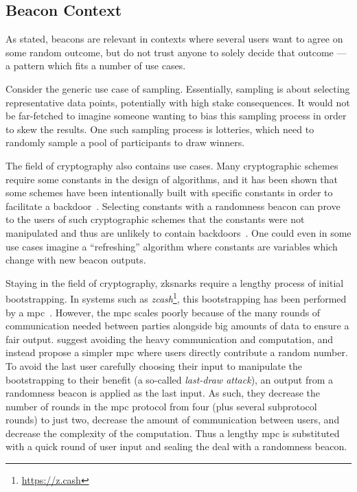 \subsection{Beacon Context}
As stated, beacons are relevant in contexts where several users want to agree on some random outcome, but do not trust anyone to solely decide that outcome --- a pattern which fits a number of use cases.

Consider the generic use case of sampling.
Essentially, sampling is about selecting representative data points, potentially with high stake consequences.
It would not be far-fetched to imagine someone wanting to bias this sampling process in order to skew the results.
One such sampling process is lotteries, which need to randomly sample a pool of participants to draw winners.

The field of cryptography also contains use cases.
Many cryptographic schemes require some constants in the design of algorithms, and it has been shown that some schemes have been intentionally built with specific constants in order to facilitate a backdoor~\cite{nist2014backdoor}.
Selecting constants with a randomness beacon can prove to the users of such cryptographic schemes that the constants were not manipulated and thus are unlikely to contain backdoors~\cite{baigneres2015trap}.
One could even in some use cases imagine a \enquote{refreshing} algorithm where constants are variables which change with new beacon outputs.

Staying in the field of cryptography, \glspl{zksnark} require a lengthy process of initial bootstrapping.
In systems such as \textit{zcash}\footnote{\url{https://z.cash}}, this bootstrapping has been performed by a \gls{mpc}~\cite{snarkparameters}.
However, the \gls{mpc} scales poorly because of the many rounds of communication needed between parties alongside big amounts of data to ensure a fair output.
\citet{mpcsnarks} suggest avoiding the heavy communication and computation, and instead propose a simpler \gls{mpc} where users directly contribute a random number.
To avoid the last user carefully choosing their input to manipulate the bootstrapping to their benefit (a so-called \emph{last-draw attack}), an output from a randomness beacon is applied as the last input.
As such, they decrease the number of rounds in the \gls{mpc} protocol from four (plus several subprotocol rounds) to just two, decrease the amount of communication between users, and decrease the complexity of the computation.
Thus a lengthy \gls{mpc} is substituted with a quick round of user input and sealing the deal with a randomness beacon.
